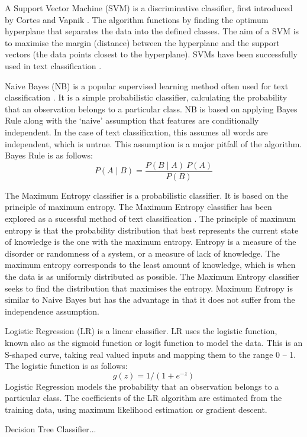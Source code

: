 A Support Vector Machine (SVM) is a discriminative classifier, first introduced by Cortes and Vapnik \cite{Vapnik1995,Vapnik21995}. The algorithm functions by finding the optimum hyperplane that separates the data into the defined classes. The aim of a SVM is to maximise the margin (distance) between the hyperplane and the support vectors (the data points closest to the hyperplane). SVMs have been successfully used in text classification \cite{Joachims1998}.

Naive Bayes (NB) is a popular supervised learning method often used for text classification \cite{NaiveBayes1998}. It is a simple probabilistic classifier, calculating the probability that an observation belongs to a particular class. NB is based on applying Bayes Rule along with the ‘naive’ assumption that features are conditionally independent. In the case of text classification, this assumes all words are independent, which is untrue. This assumption is a major pitfall of the algorithm. Bayes Rule is as follows:  \[P(A\mid B)=\frac{P(B\mid A)\:P(A)}{P(B)}\] 

The Maximum Entropy classifier is a probabilistic classifier. It is based on the principle of maximum entropy. The Maximum Entropy classifier has been explored as a sucessful method of text classification \cite{MaxEnt1999}. The principle of maximum entropy is that the probability distribution that best represents the current state of knowledge is the one with the maximum entropy. Entropy is a measure of the disorder or randomness of a system, or a measure of lack of knowledge. The maximum entropy corresponds to the least amount of knowledge, which is when the data is as uniformly distributed as possible. The Maximum Entropy classifier seeks to find the distribution that maximises the entropy. Maximum Entropy is similar to Naive Bayes but has the advantage in that it does not suffer from the independence assumption.

Logistic Regression (LR) is a linear classifier. LR uses the logistic function, known also as the sigmoid function or logit function to model the data. This is an S-shaped curve, taking real valued inputs and mapping them to the range 0 – 1. The logistic function is as follows: \[g(z)=1/(1+e^{-z})\]
Logistic Regression models the probability that an observation belongs to a particular class. The coefficients of the LR algorithm are estimated from the training data, using maximum likelihood estimation or gradient descent.

Decision Tree Classifier...

